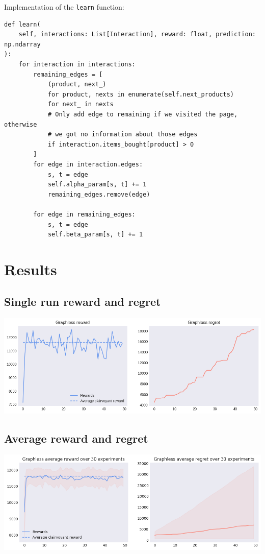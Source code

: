 Implementation of the \texttt{learn} function:

\begin{lstlisting}[style=Python]
def learn(
	self, interactions: List[Interaction], reward: float, prediction: np.ndarray
):
	for interaction in interactions:
		remaining_edges = [
			(product, next_)
			for product, nexts in enumerate(self.next_products)
			for next_ in nexts
			# Only add edge to remaining if we visited the page, otherwise
			# we got no information about those edges
			if interaction.items_bought[product] > 0
		]
		for edge in interaction.edges:
			s, t = edge
			self.alpha_param[s, t] += 1
			remaining_edges.remove(edge)

		for edge in remaining_edges:
			s, t = edge
			self.beta_param[s, t] += 1
\end{lstlisting}

\section{Results}
\label{sec:unc_w_res}

\subsection{Single run reward and regret}

\begin{center}
	\includegraphics[scale=0.5]{img/Graphs/graphless/image1.png}
\end{center}

\subsection{Average reward and regret}

\begin{center}
	\includegraphics[scale=0.5]{img/Graphs/graphless/image2.png}
\end{center}

